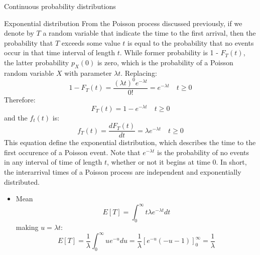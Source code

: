 \documentclass[8pt]{beamer}
\renewcommand{\emph}[1]{\textcolor{myorange}{#1}}
\begin{document}
\begin{frame}{Continuous probability distributions}
    \begin{block}{\alert{Exponential} distribution}
        From the \alert{Poisson process} discussed previously, if we denote by $T$ a random variable that indicate the time to the first arrival, then the probability that $T$ exceeds some value $t$ is equal to the probability that no events occur in that time interval of length $t$. While former probability is 1 - $F_T (t)$, the latter probability $p_X (0)$ is zero, which is the probability of a Poisson random variable $X$ with parameter $\lambda t$. Replacing:
        \[
            1- F_T (t) = \frac{(\lambda t)^0 e^{-\lambda t}}{0!} = e^{-\lambda t} \quad t\geq 0
        \]
        Therefore:
        \[
            F_T (t) = 1 - e^{-\lambda t} \quad t\geq 0
        \]
        and the $f_t (t)$ is:
        \[
            f_T (t) = \frac{d F_T (t) }{dt} = \lambda e^{-\lambda t} \quad t\geq 0
        \]
        This equation define the \alert{exponential distribution}, which describes the time to the first occurence of a Poisson event. Note that $e^{-\lambda t}$ is the probability of no events in any interval of time of length $t$, whether or not it begins at time 0. In short, the interarrival times of a \alert{Poisson process} are independent and exponentially distributed. 
        \begin{itemize}
            \item \emph{Mean}
                \vspace{-5pt}
                \[
                    E[T] = \int_0^\infty t \lambda e^{-\lambda t} dt
                \]
                \vspace{-5pt}
                making $u=\lambda t$:
                \vspace{-5pt}
                \[
                    E[T] = \frac{1}{\lambda} \int_0^\infty u e^{-u} du = \frac{1}{\lambda} \left[ e^{-u} (-u-1) \right]_0^\infty = \frac{1}{\lambda}
                \]
        \end{itemize}
    \end{block}
\end{frame}
\end{document}
